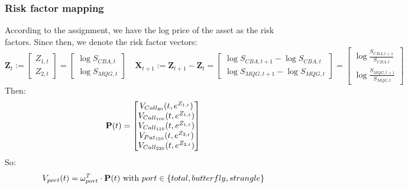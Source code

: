 \subsubsection{Risk factor mapping}
According to the assignment, we have the log price of the asset as the risk factors. Since then, we denote the risk factor vectors:
$$
\mathbf{Z}_t := \begin{bmatrix} Z_{1,t} \\  Z_{2,t}  \end{bmatrix}=\begin{bmatrix} \log S_{CBA,t} \\ \log S_{MQG,t}  \end{bmatrix}
\quad
\mathbf{X}_{t+1}:=\mathbf{Z}_{t+1}-\mathbf{Z}_t=\begin{bmatrix} \log S_{CBA,t+1}- \log S_{CBA,t} \\ \log S_{MQG,t+1}-\log S_{MQG,t}  \end{bmatrix}=\begin{bmatrix} \log \frac{S_{CBA,t+1}}{S_{CBA,t}} \\ \log \frac{S_{MQG,t+1}}{S_{MQG,t}}   \end{bmatrix}
$$
Then:
\[
\mathbf{P}(t) =\begin{bmatrix} V_{Call_{80}}(t, e^{Z_{1,t}}) \\  V_{Call_{100}}(t, e^{Z_{1,t}})\\ V_{Call_{110}}(t, e^{Z_{1,t}}) \\ V_{Put_{150}}(t, e^{Z_{2,t}}) \\  V_{Call_{220}}(t, e^{Z_{2,t}})\end{bmatrix}\\
\]
So:
\[
V_{port}(t)= \omega_{port}^T \cdot \mathbf{P}(t) \text{ with $port \in \{total, butterfly, strangle\}$}\\
\]


